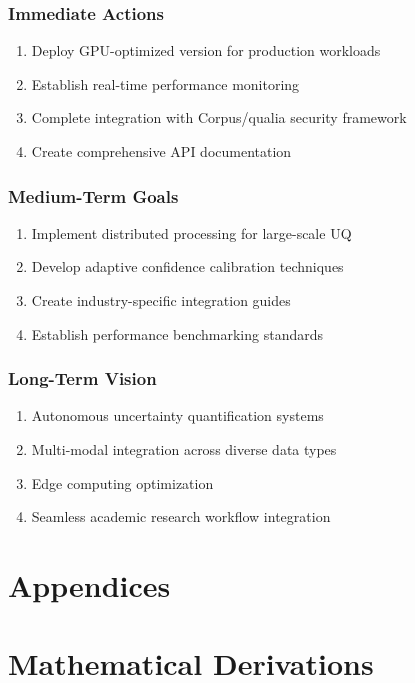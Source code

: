 \documentclass[11pt,a4paper]{article}
\newcommand{\corpusqualia}{Corpus/qualia}
\begin{document}
\subsubsection{Immediate Actions}
\begin{enumerate}
    \item Deploy GPU-optimized version for production workloads
    \item Establish real-time performance monitoring
    \item Complete integration with \corpusqualia{} security framework
    \item Create comprehensive API documentation
\end{enumerate}

\subsubsection{Medium-Term Goals}
\begin{enumerate}
    \item Implement distributed processing for large-scale UQ
    \item Develop adaptive confidence calibration techniques
    \item Create industry-specific integration guides
    \item Establish performance benchmarking standards
\end{enumerate}

\subsubsection{Long-Term Vision}
\begin{enumerate}
    \item Autonomous uncertainty quantification systems
    \item Multi-modal integration across diverse data types
    \item Edge computing optimization
    \item Seamless academic research workflow integration
\end{enumerate}

\section*{Appendices}

\appendix

\section{Mathematical Derivations}
\label{appendix:mathematical_derivations}
\end{document}
